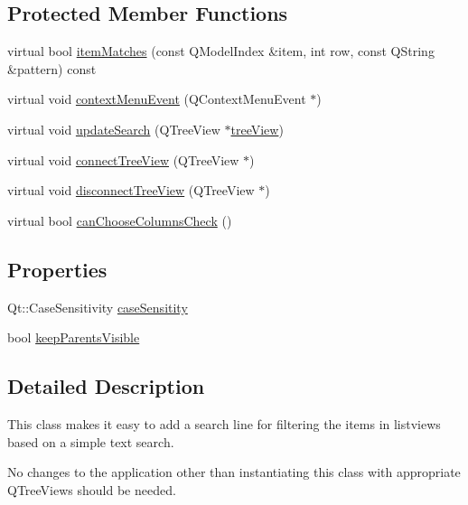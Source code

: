 \subsection*{Protected Member Functions}
\begin{DoxyCompactItemize}
\item 
virtual bool \hyperlink{classKTreeViewSearchLine_a89b1a182dbc3ee70a560a62c607808ee}{item\+Matches} (const Q\+Model\+Index \&item, int row, const Q\+String \&pattern) const 
\item 
virtual void \hyperlink{classKTreeViewSearchLine_acc7b16be8bca22303bdb06f340bbff97}{context\+Menu\+Event} (Q\+Context\+Menu\+Event $\ast$)
\item 
virtual void \hyperlink{classKTreeViewSearchLine_a0a17e83a54dd07ed391dc34f0442710f}{update\+Search} (Q\+Tree\+View $\ast$\hyperlink{classKTreeViewSearchLine_aeeec1dac59277de847c59fbad49d53b6}{tree\+View})
\item 
virtual void \hyperlink{classKTreeViewSearchLine_a5ebe1beb6643386651a0bde66561c420}{connect\+Tree\+View} (Q\+Tree\+View $\ast$)
\item 
virtual void \hyperlink{classKTreeViewSearchLine_a7b95b3369617c600159d2f5a5ea2e203}{disconnect\+Tree\+View} (Q\+Tree\+View $\ast$)
\item 
virtual bool \hyperlink{classKTreeViewSearchLine_a6fbd99745faf5915d44244a52610f68c}{can\+Choose\+Columns\+Check} ()
\end{DoxyCompactItemize}
\subsection*{Properties}
\begin{DoxyCompactItemize}
\item 
Qt\+::\+Case\+Sensitivity \hyperlink{classKTreeViewSearchLine_aae0f956eff2d0d6cd9d883a646a33da8}{case\+Sensitity}
\item 
bool \hyperlink{classKTreeViewSearchLine_a51e8d818d4b5541f1d6e50552ba1cf6c}{keep\+Parents\+Visible}
\end{DoxyCompactItemize}


\subsection{Detailed Description}
This class makes it easy to add a search line for filtering the items in listviews based on a simple text search.

No changes to the application other than instantiating this class with appropriate Q\+Tree\+Views should be needed. 

